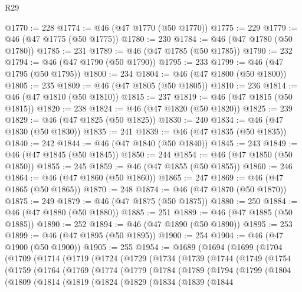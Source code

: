 \begin{lexlean}{R29}
\begin{coremodule}
@1770 := 228
@1774 := @46 (@47 @1770 (@50 @1770))
@1775 := 229
@1779 := @46 (@47 @1775 (@50 @1775))
@1780 := 230
@1784 := @46 (@47 @1780 (@50 @1780))
@1785 := 231
@1789 := @46 (@47 @1785 (@50 @1785))
@1790 := 232
@1794 := @46 (@47 @1790 (@50 @1790))
@1795 := 233
@1799 := @46 (@47 @1795 (@50 @1795))
@1800 := 234
@1804 := @46 (@47 @1800 (@50 @1800))
@1805 := 235
@1809 := @46 (@47 @1805 (@50 @1805))
@1810 := 236
@1814 := @46 (@47 @1810 (@50 @1810))
@1815 := 237
@1819 := @46 (@47 @1815 (@50 @1815))
@1820 := 238
@1824 := @46 (@47 @1820 (@50 @1820))
@1825 := 239
@1829 := @46 (@47 @1825 (@50 @1825))
@1830 := 240
@1834 := @46 (@47 @1830 (@50 @1830))
@1835 := 241
@1839 := @46 (@47 @1835 (@50 @1835))
@1840 := 242
@1844 := @46 (@47 @1840 (@50 @1840))
@1845 := 243
@1849 := @46 (@47 @1845 (@50 @1845))
@1850 := 244
@1854 := @46 (@47 @1850 (@50 @1850))
@1855 := 245
@1859 := @46 (@47 @1855 (@50 @1855))
@1860 := 246
@1864 := @46 (@47 @1860 (@50 @1860))
@1865 := 247
@1869 := @46 (@47 @1865 (@50 @1865))
@1870 := 248
@1874 := @46 (@47 @1870 (@50 @1870))
@1875 := 249
@1879 := @46 (@47 @1875 (@50 @1875))
@1880 := 250
@1884 := @46 (@47 @1880 (@50 @1880))
@1885 := 251
@1889 := @46 (@47 @1885 (@50 @1885))
@1890 := 252
@1894 := @46 (@47 @1890 (@50 @1890))
@1895 := 253
@1899 := @46 (@47 @1895 (@50 @1895))
@1900 := 254
@1904 := @46 (@47 @1900 (@50 @1900))
@1905 := 255
@1954 := @1689
    (@1694
      (@1699
        (@1704
          (@1709
            (@1714
              (@1719
                (@1724
                  (@1729
                    (@1734
                      (@1739
                        (@1744
                          (@1749
                            (@1754
                              (@1759
                                (@1764
                                  (@1769
                                    (@1774
                                      (@1779
                                        (@1784
                                          (@1789
                                            (@1794
                                              (@1799
                                                (@1804
                                                  (@1809
                                                    (@1814
                                                      (@1819
                                                        (@1824
                                                          (@1829
                                                            (@1834
                                                              (@1839
                                                                (@1844

\end{coremodule}
\end{lexlean}
